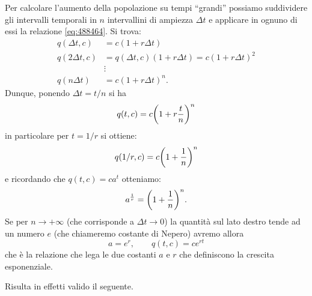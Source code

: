 Per calcolare l'aumento della popolazione su tempi ``grandi'' possiamo
suddividere gli intervalli temporali in $n$ intervallini di ampiezza
$\Delta t$ e applicare in ognuno di essi la relazione \eqref{eq:488464}.
Si trova:
\begin{align*}
 q(\Delta t,c) &= c(1+r\Delta t) \\
 q(2\Delta t,c) &= q(\Delta t,c) (1+r\Delta t)  = c(1+r\Delta t)^2\\
 &\vdots \\
 q(n\Delta t) &= c(1+r\Delta t)^n.
\end{align*}
Dunque, ponendo $\Delta t=t/n$ si ha
\[
  q(t,c) = c{\left( 1+r\frac{t}{n} \right)}^n
\]
in particolare per $t=1/r$ si ottiene:
\[
  q(1/r,c) = c{\left( 1+\frac{1}{n} \right)}^n
\]
e ricordando che $q(t,c)=c a^t$ otteniamo:
\[
  a^{\frac 1 r} = {\left( 1+\frac{1}{n} \right)}^n.
\]
Se per $n\to +\infty$ (che corrisponde a $\Delta t \to 0$)
la quantità sul lato destro tende ad un numero $e$ (che chiameremo costante
di Nepero) avremo allora
\[
  a = e^r, \qquad q(t,c) = c e^{rt}
\]
che è la relazione che lega le due costanti $a$ e $r$ che definiscono
la crescita esponenziale.

Risulta in effetti valido il seguente.

